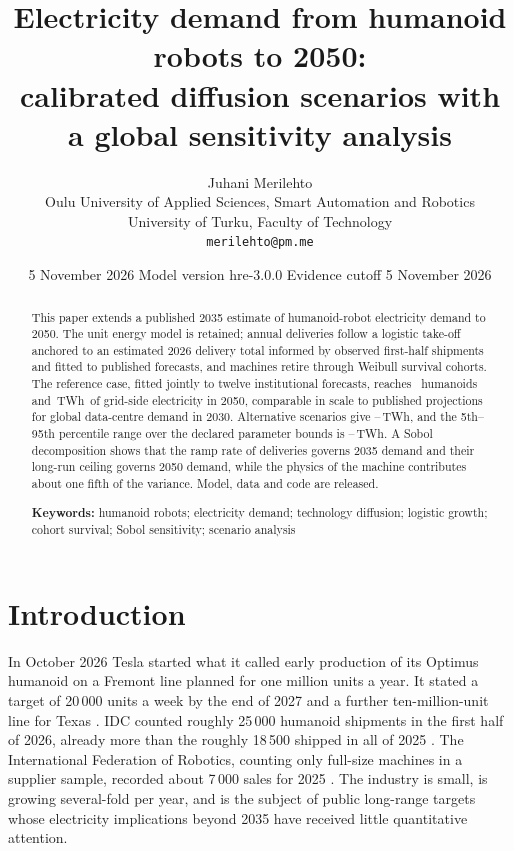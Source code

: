 \documentclass[11pt]{article}
\title{\vspace{-0.6cm}\textbf{Electricity demand from humanoid robots to 2050:\\[2pt]
calibrated diffusion scenarios with a global sensitivity analysis}}
\author{Juhani Merilehto\\[2pt]
\small Oulu University of Applied Sciences, Smart Automation and Robotics\\
\small University of Turku, Faculty of Technology\\
\small\texttt{merilehto@pm.me}}
\date{\small 5 November 2026 \quad\textbullet\quad Model version hre-3.0.0 \quad\textbullet\quad Evidence cutoff 5 November 2026}
\newcommand{\TWh}{\,TWh}
\begin{document}
\maketitle
\thispagestyle{plain}

\begin{abstract}
\noindent
This paper extends a published 2035 estimate of humanoid-robot electricity demand to 2050. The unit energy model is retained; annual deliveries follow a logistic take-off anchored to an estimated 2026 delivery total informed by observed first-half shipments and fitted to published forecasts, and machines retire through Weibull survival cohorts. The reference case, fitted jointly to twelve institutional forecasts, reaches \RefStockFifty\ humanoids and \RefTWhFifty\TWh\ of grid-side electricity in 2050, comparable in scale to published projections for global data-centre demand in 2030. Alternative scenarios give \ConTWhFifty--\AbuTWhFifty\TWh, and the 5th--95th percentile range over the declared parameter bounds is \MCHFiftyFive--\MCHFiftyNinetyFive\TWh. A Sobol decomposition shows that the ramp rate of deliveries governs 2035 demand and their long-run ceiling governs 2050 demand, while the physics of the machine contributes about one fifth of the variance. Model, data and code are released.

\medskip\noindent\textbf{Keywords:} humanoid robots; electricity demand; technology diffusion; logistic growth; cohort survival; Sobol sensitivity; scenario analysis
\end{abstract}

\section{Introduction}\label{sec:intro}

In October 2026 Tesla started what it called early production of its Optimus humanoid on a Fremont line planned for one million units a year. It stated a target of 20\,000 units a week by the end of 2027 and a further ten-million-unit line for Texas \citep{tesla2026q3,notatesla2026}. IDC counted roughly 25\,000 humanoid shipments in the first half of 2026, already more than the roughly 18\,500 shipped in all of 2025 \citep{idc2026blog}. The International Federation of Robotics, counting only full-size machines in a supplier sample, recorded about 7\,000 sales for 2025 \citep{ifr2026service}. The industry is small, is growing several-fold per year, and is the subject of public long-range targets whose electricity implications beyond 2035 have received little quantitative attention.
\end{document}
